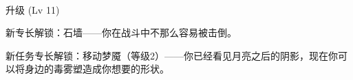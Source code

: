 \clearpage

~\vfill

\begin{note}
升级 (Lv 11) 

新专长解锁：石墙——你在战斗中不那么容易被击倒。

新任务专长解锁：移动梦魇（等级2）——你已经看见月亮之后的阴影，现在你可以将身边的毒雾塑造成你想要的形状。
\end{note}



